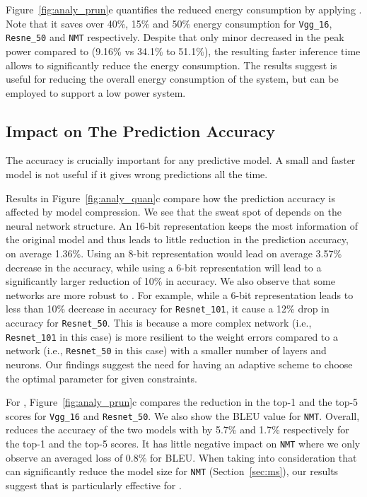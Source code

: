 Figure~\ref{fig:analy_prun}e quantifies the reduced energy consumption by applying \pruning. Note that it saves over 40\%, 15\% and 50\%
energy consumption for \texttt{Vgg\_16}, \texttt{Resne\_50} and \texttt{NMT} respectively. Despite that only minor decreased in the peak
power compared to \quantization (9.16\% vs 34.1\% to 51.1\%), the resulting faster inference time allows \pruning to significantly reduce
the energy consumption. The results suggest \pruning is useful for reducing the overall energy consumption of the system, but \quantization
can be employed to support a low power system.

\subsection{Impact on The Prediction Accuracy}
The accuracy is crucially important for any predictive model. A small and faster model is not useful if it gives wrong predictions all the
time.


Results in Figure~\ref{fig:analy_quan}c compare how the prediction accuracy is affected by model compression. We see that the sweat spot of
\quantization depends on the neural network structure. An 16-bit representation keeps the most information of the original model and thus
leads to little reduction in the prediction accuracy, on average  1.36\%.  Using an 8-bit representation would lead on average 3.57\%
decrease in the accuracy, while using a 6-bit representation will lead to a significantly larger reduction of 10\% in  accuracy. We also
observe that some networks are more robust to \quantization. For example, while a 6-bit representation leads to less than 10\% decrease in
accuracy for \texttt{Resnet\_101}, it cause a 12\% drop in accuracy for \texttt{Resnet\_50}. This is because a more complex network (i.e.,
\texttt{Resnet\_101} in this case) is more resilient to the weight errors compared to a network (i.e., \texttt{Resnet\_50} in this case)
with a smaller number of layers and neurons. Our findings suggest the need for having an adaptive scheme to choose the optimal
\dquantization parameter for given constraints.


For \pruning, Figure~\ref{fig:analy_prun}c compares the reduction in the top-1 and the top-5 scores for \texttt{Vgg\_16} and
\texttt{Resnet\_50}. We also show the BLEU value for \texttt{NMT}. Overall, \pruning reduces the accuracy of the two \CNN models with by
5.7\% and 1.7\% respectively for the top-1 and the top-5 scores. It has little negative impact on \texttt{NMT} where we only observe an
averaged loss of 0.8\% for BLEU. When taking into consideration that \pruning can significantly reduce the model size for \texttt{NMT}
(Section~\ref{sec:ms}), our results suggest that \pruning is particularly effective for \RNNs.

